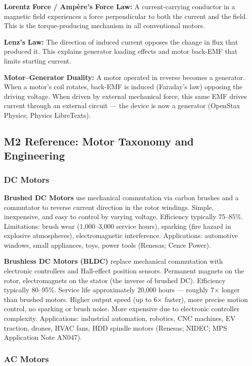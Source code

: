 \documentclass[11pt,letterpaper]{article}
\begin{document}
\textbf{Lorentz Force / Amp\`ere's Force Law:} A current-carrying conductor in a magnetic field experiences a force perpendicular to both the current and the field. This is the torque-producing mechanism in all conventional motors.

\textbf{Lenz's Law:} The direction of induced current opposes the change in flux that produced it. This explains generator loading effects and motor back-EMF that limits starting current.

\textbf{Motor--Generator Duality:} A motor operated in reverse becomes a generator. When a motor's coil rotates, back-EMF is induced (Faraday's law) opposing the driving voltage. When driven by external mechanical force, this same EMF drives current through an external circuit --- the device is now a generator (OpenStax Physics; Physics LibreTexts).

\subsection{M2 Reference: Motor Taxonomy and Engineering}

\subsubsection{DC Motors}

\textbf{Brushed DC Motors} use mechanical commutation via carbon brushes and a commutator to reverse current direction in the rotor windings. Simple, inexpensive, and easy to control by varying voltage. Efficiency typically 75--85\%. Limitations: brush wear (1,000--3,000 service hours), sparking (fire hazard in explosive atmospheres), electromagnetic interference. Applications: automotive windows, small appliances, toys, power tools (Renesas; Cence Power).

\textbf{Brushless DC Motors (BLDC)} replace mechanical commutation with electronic controllers and Hall-effect position sensors. Permanent magnets on the rotor, electromagnets on the stator (the inverse of brushed DC). Efficiency typically 80--95\%. Service life approximately 20,000 hours --- roughly 7$\times$ longer than brushed motors. Higher output speed (up to 6$\times$ faster), more precise motion control, no sparking or brush noise. More expensive due to electronic controller complexity. Applications: industrial automation, robotics, CNC machines, EV traction, drones, HVAC fans, HDD spindle motors (Renesas; NIDEC; MPS Application Note AN047).

\subsubsection{AC Motors}
\end{document}
